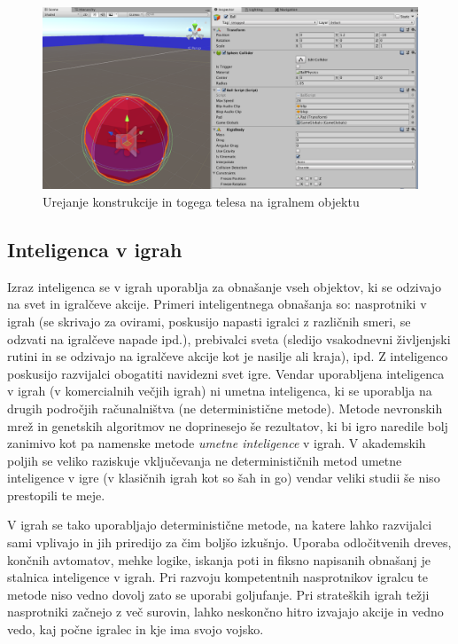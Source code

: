 \documentclass[12pt,a4paper,twoside]{book}
\begin{document}
\begin{figure}[h]
	\centering
	\includegraphics[width=15cm]{unityRigidbody}
	\caption{Urejanje konstrukcije in togega telesa na igralnem objektu}
	\label{slika:unityRigidbody}
\end{figure}

\subsection{Inteligenca v igrah}
Izraz inteligenca se v igrah uporablja za obnašanje vseh objektov, ki se odzivajo na svet in igralčeve akcije. Primeri inteligentnega obnašanja so: nasprotniki v igrah (se skrivajo za ovirami, poskusijo napasti igralci z različnih smeri, se odzvati na igralčeve napade ipd.), prebivalci sveta (sledijo vsakodnevni življenjski rutini in se odzivajo na igralčeve akcije kot je nasilje ali kraja), ipd. Z inteligenco poskusijo razvijalci obogatiti navidezni svet igre. Vendar uporabljena inteligenca v igrah (v komercialnih večjih igrah) ni umetna inteligenca, ki se uporablja na drugih področjih računalništva (ne deterministične metode). Metode nevronskih mrež in genetskih algoritmov ne doprinesejo še rezultatov, ki bi igro naredile bolj zanimivo kot pa namenske metode \textit{umetne inteligence} v igrah. V akademskih poljih se veliko raziskuje vključevanja ne determinističnih metod umetne inteligence v igre (v klasičnih igrah kot so šah in go) vendar veliki studii še niso prestopili te meje. 

V igrah se tako uporabljajo deterministične metode, na katere lahko razvijalci sami vplivajo in jih priredijo za čim boljšo izkušnjo. Uporaba odločitvenih dreves, končnih avtomatov, mehke logike, iskanja poti in fiksno napisanih obnašanj je stalnica inteligence v igrah. Pri razvoju kompetentnih nasprotnikov igralcu te metode niso vedno dovolj zato se uporabi goljufanje. Pri strateških igrah težji nasprotniki začnejo z več surovin, lahko neskončno hitro izvajajo akcije in vedno vedo, kaj počne igralec in kje ima svojo vojsko.
\end{document}

